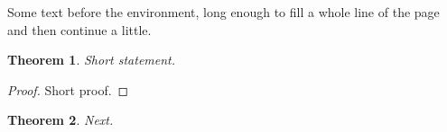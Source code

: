 \documentclass[12pt]{article}
\newtheorem{theorem}{Theorem}
\begin{document}
Some text before the environment, long enough to fill a whole line of the page and then continue a little.
\begin{theorem}
Short statement.
\end{theorem}
\begin{proof}
Short proof.
\end{proof}
\begin{theorem}
Next.
\end{theorem}
\end{document}
